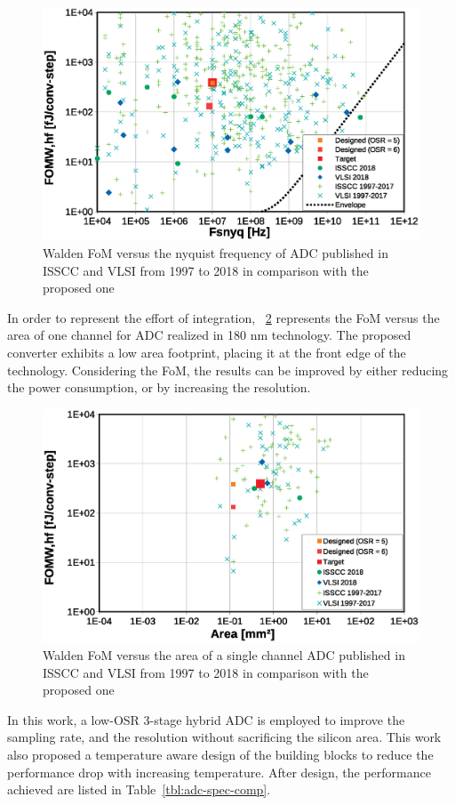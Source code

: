 \begin{figure}[htp]
    \centering
    \includegraphics[width=.75\textwidth]{Chapter5/Figs/adc_chip/walden-fom-2018-designed.eps}
    \caption{Walden FoM versus the nyquist frequency of ADC published in ISSCC and VLSI from 1997 to 2018 in comparison with the proposed one}
    \label{fig:walden-fom-comparison-designed}
\end{figure}

In order to represent the effort of integration, \figurename~\ref{fig:walden-area-fom-comparison-designed} represents the FoM versus the area of one channel for ADC realized in 180 nm technology. The proposed converter exhibits a low area footprint, placing it at the front edge of the technology. Considering the FoM, the results can be improved by either reducing the power consumption, or by increasing the resolution.

\begin{figure}[htp]
    \centering
    \includegraphics[width=.75\textwidth]{Chapter5/Figs/adc_chip/walden-fom-area-180nm.eps}
    \caption{Walden FoM versus the area of a single channel ADC published in ISSCC and VLSI from 1997 to 2018 in comparison with the proposed one}
    \label{fig:walden-area-fom-comparison-designed}
\end{figure}

In this work, a low-OSR 3-stage hybrid ADC is employed to improve the sampling rate, and the resolution without sacrificing the silicon area. This work also proposed a temperature aware design of the building blocks to reduce the performance drop with increasing temperature. After design, the performance achieved are listed in Table~\ref{tbl:adc-spec-comp}.

